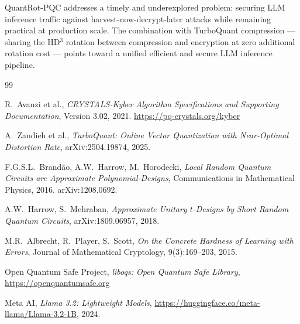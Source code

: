 \documentclass[preprint,a4paper]{article}
\begin{document}
QuantRot-PQC addresses a timely and underexplored
problem: securing LLM inference traffic against
harvest-now-decrypt-later attacks while remaining
practical at production scale. The combination with
TurboQuant compression --- sharing the HD$^3$
rotation between compression and encryption at zero
additional rotation cost --- points toward a unified
efficient and secure LLM inference pipeline.


\begin{thebibliography}{99}

R.~Avanzi et al.,
\textit{CRYSTALS-Kyber Algorithm Specifications and
Supporting Documentation}, Version 3.02, 2021.
\url{https://pq-crystals.org/kyber}

A.~Zandieh et al.,
\textit{TurboQuant: Online Vector Quantization with
Near-Optimal Distortion Rate},
arXiv:2504.19874, 2025.

F.G.S.L.~Brand\~{a}o, A.W.~Harrow, M.~Horodecki,
\textit{Local Random Quantum Circuits are Approximate
Polynomial-Designs},
Communications in Mathematical Physics, 2016.
arXiv:1208.0692.

A.W.~Harrow, S.~Mehraban,
\textit{Approximate Unitary $t$-Designs by Short Random
Quantum Circuits},
arXiv:1809.06957, 2018.

M.R.~Albrecht, R.~Player, S.~Scott,
\textit{On the Concrete Hardness of Learning with Errors},
Journal of Mathematical Cryptology, 9(3):169--203, 2015.

Open Quantum Safe Project,
\textit{liboqs: Open Quantum Safe Library},
\url{https://openquantumsafe.org}

Meta AI,
\textit{Llama 3.2: Lightweight Models},
\url{https://huggingface.co/meta-llama/Llama-3.2-1B},
2024.

\end{thebibliography}
\end{document}
